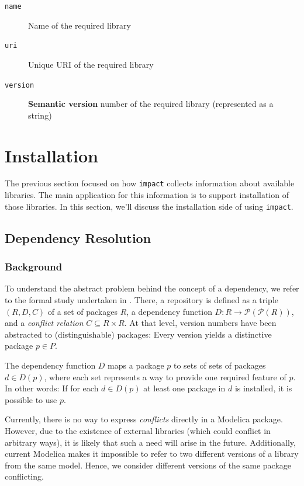 \documentclass[11pt,a4paper,twocolumn]{article}
\newcommand{\code}[1]{\texttt{#1}} %
\begin{document}
\begin{description}
  \item[\code{name}] Name of the required library
  \item[\code{uri}] Unique URI of the required library
  \item[\code{version}] \textbf{Semantic version} number of the required
    library (represented as a string)
\end{description}

\section{Installation}

The previous section focused on how \code{impact} collects information
about available libraries.  The main application for this information
is to support installation of those libraries.  In this section, we'll
discuss the installation side of using \code{impact}.

\subsection{Dependency Resolution}

\subsubsection{Background}

To understand the abstract problem behind the concept of a dependency,
we refer to the formal study undertaken in \parencite{boender2011formal}.
There, a repository is defined as a triple $(R,D,C)$ of a set of
packages $R$, a dependency function $D : R \rightarrow
\mathcal{P}(\mathcal{P}(R))$, and a \emph{conflict relation} $C
\subseteq R \times R$.  At that level, version numbers have been
abstracted to (distinguishable) packages: Every version yields a
distinctive package $p \in P$.

The dependency function $D$ maps a package $p$ to sets of sets of
packages $d \in D(p)$, where each set represents a way to provide one
required feature of $p$.  In other words: If for each $d \in
D(p)$ at least one package in $d$ is installed, it is possible to use
$p$.

Currently, there is no way to express \emph{conflicts} directly in a
Modelica package.  However, due to the existence of external libraries
(which could conflict in arbitrary ways), it is likely that such a
need will arise in the future.  Additionally, current Modelica makes
it impossible to refer to two different versions of a library from the
same model.  Hence, we consider different versions of the same package
conflicting.
\end{document}
